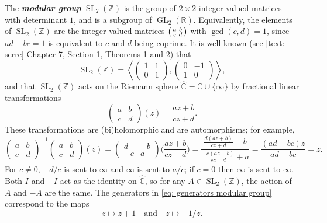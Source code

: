 \documentclass[10pt,leqno]{article}
\newcommand{\textib}[1]{\textbf{\textit{#1}}}
\DeclareMathOperator{\GL}{GL}
\DeclareMathOperator{\SL}{SL}
\begin{document}
The \textib{modular group} $\SL_2(\mathbb{Z})$ is the group of $2\times 2$ integer-valued matrices with determinant $1$, and is a subgroup of $\GL_2(\mathbb{R})$. Equivalently, the elements of $\SL_2(\mathbb{Z})$ are the integer-valued matrices $\begin{psmallmatrix}
    a & b \\ c & d
\end{psmallmatrix}$ with $\gcd(c,d) = 1$, since $ad-bc = 1$ is equivalent to $c$ and $d$ being coprime. It is well known (see \cref{text: serre} Chapter 7, Section 1, Theorems 1 and 2) that 
\begin{equation}\label{eq: generators modular group}
    \SL_2(\mathbb{Z}) = \left\langle\begin{pmatrix}
        1 & 1 \\ 0 & 1
    \end{pmatrix}, \begin{pmatrix}
        0 & -1 \\ 1 & 0
    \end{pmatrix}\right\rangle, 
\end{equation}
and that $\SL_2(\mathbb{Z})$ acts on the Riemann sphere $\widehat{\mathbb{C}} = \mathbb{C}\cup \{\infty\}$ by fractional linear transformations
\[\begin{pmatrix}
    a & b \\ c & d
\end{pmatrix}(z) = \frac{az + b}{cz + d}.\] These transformations are (bi)holomorphic and are automorphisms; for example, \[\begin{pmatrix}
    a & b \\ c & d
\end{pmatrix}^{-1}\begin{pmatrix}
    a & b \\ c & d
\end{pmatrix}(z) = \begin{pmatrix}
    d & -b \\ -c & a
\end{pmatrix}\bigg(\frac{az+b}{cz+d}\bigg) = \frac{\frac{d(az+b)}{cz+d}- b}{\frac{-c(az+b)}{cz+d}+a} = \frac{(ad-bc)z}{ad-bc} = z.\] For $c\neq 0$, $-d/c$ is sent to $\infty$ and $\infty$ is sent to $a/c$; if $c = 0$ then $\infty$ is sent to $\infty$. Both $I$ and $-I$ act as the identity on $\widehat{\mathbb{C}}$, so for any $A\in \SL_2(\mathbb{Z})$, the action of $A$ and $-A$ are the same. The generators in \cref{eq: generators modular group} correspond to the maps
\[z\mapsto z+1\quad\text{and}\quad z\mapsto -1/z.\]
\end{document}
